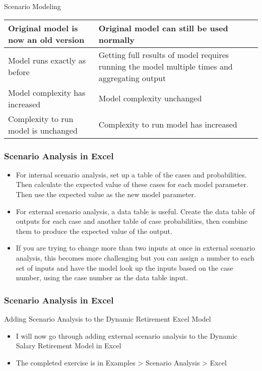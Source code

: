 \documentclass[handout, 11pt]{beamer}
\begin{document}
\begin{section}{Scenario Modeling}
\begin{frame}
\begin{center}
\begin{tabular}{L{5cm}|R{5cm}}
\midrule
\midrule
Original model is now an old version & Original model can still be used normally\\

\midrule
Model runs exactly as before & Getting full results of model requires running the model multiple times and aggregating output\\

\midrule
Model complexity has increased & Model complexity unchanged\\

\midrule
Complexity to run model is unchanged & Complexity to run model has increased\\

\end{tabular}
\end{center}
\end{frame}
\begin{frame}
\frametitle{Scenario Analysis in Excel}
\begin{itemize}
\item For internal scenario analysis, set up a table of the cases and probabilities. Then calculate the expected value of these cases for each model parameter. Then use the expected value as the new model parameter.
\vfill
\item For external scenario analysis, a data table is useful. Create the data table of outputs for each case and another table of case probabilities, then combine them to produce the expected value of the output.
\vfill
\item If you are trying to change more than two inputs at once in external scenario analysis, this becomes more challenging but you can assign a number to each set of inputs and have the model look up the inputs based on the case number, using the case number as the data table input.
\end{itemize}
\end{frame}
\begin{frame}
\frametitle{Scenario Analysis in Excel}
{
\begin{block}{Adding Scenario Analysis to the Dynamic Retirement Excel Model}
\begin{itemize}
\item I will now go through adding external scenario analysis to the Dynamic Salary Retirement Model in Excel
\item The completed exercise is in Examples > Scenario Analysis > Excel 
\end{itemize}

\end{block}}
\end{frame}
\end{section}
\end{document}
